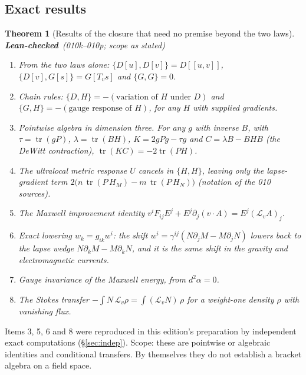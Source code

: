 \documentclass[11pt,a4paper]{article}
\DeclareMathOperator{\tr}{tr}\DeclareMathOperator{\sig}{sig}\DeclareMathOperator{\arccosh}{arccosh}
\newcommand{\st}[1]{\textsf{\small\textbf{#1}}}
\newcommand{\Slean}{\st{Lean-checked}}\newcommand{\Scond}{\st{Conditional}}
\theoremstyle{plain}
\newtheorem{thm}{Theorem}[section]
\theoremstyle{definition}
\theoremstyle{remark}
\begin{document}
\subsection{Exact results}\label{sec:exact010}
\begin{thm}[Results of the closure that need no premise beyond the two laws]\Slean\ \textit{(010k--010p; scope as stated)}
\begin{enumerate}[label=\arabic*.,nosep]
\item From the two laws alone: $\{D[u],D[v]\}=D[[u,v]]$, $\{D[v],G[s]\}=G[T_vs]$ and $\{G,G\}=0$.
\item Chain rules: $\{D,H\}=-(\text{variation of }H\text{ under }D)$ and $\{G,H\}=-(\text{gauge response of }H)$, for any $H$ with supplied gradients.
\item Pointwise algebra in dimension three. For any $g$ with inverse $B$, with $\tau=\tr(gP)$, $\lambda=\tr(BH)$, $K=2gPg-\tau g$ and $C=\lambda B-BHB$ (the DeWitt contraction), $\tr(KC)=-2\tr(PH)$.
\item The ultralocal metric response $U$ cancels in $\{H,H\}$, leaving only the lapse-gradient term $2\bigl(n\,\tr(P\,H_M)-m\,\tr(P\,H_N)\bigr)$ (notation of the 010 sources).
\item The Maxwell improvement identity $v^iF_{ij}E^j+E^j\partial_j(v\!\cdot\!A)=E^j(\mathcal L_vA)_j$.
\item Exact lowering $w_k=g_{ik}w^i$: the shift $w^i=\gamma^{ij}(N\partial_jM-M\partial_jN)$ lowers back to the lapse wedge $N\partial_kM-M\partial_kN$, and it is the same shift in the gravity and electromagnetic currents.
\item Gauge invariance of the Maxwell energy, from $d^2\alpha=0$.
\item The Stokes transfer $-\!\int N\,\mathcal L_v\rho=\int(\mathcal L_vN)\,\rho$ for a weight-one density $\rho$ with vanishing flux.
\end{enumerate}
\end{thm}
Items 3, 5, 6 and 8 were reproduced in this edition's preparation by independent exact computations (\S\ref{sec:indep}). Scope: these are pointwise or algebraic identities and conditional transfers. By themselves they do not establish a bracket algebra on a field space.
\end{document}
